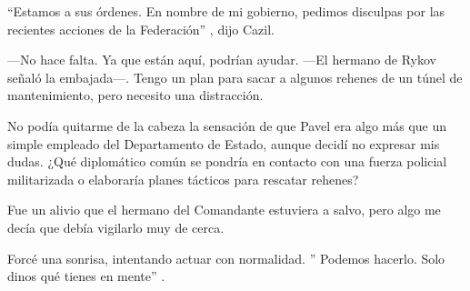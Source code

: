 ``Estamos a sus órdenes. En nombre de mi gobierno, pedimos disculpas por las recientes acciones de la Federación''
, dijo Cazil.

—No hace falta. Ya que están aquí, podrían ayudar. —El hermano de Rykov señaló la embajada—. Tengo un plan para sacar a algunos rehenes de un túnel de mantenimiento, pero necesito una distracción.

No podía quitarme de la cabeza la sensación de que Pavel era algo más que un simple empleado del Departamento de Estado, aunque decidí no expresar mis dudas. ¿Qué diplomático común se pondría en contacto con una fuerza policial militarizada o elaboraría planes tácticos para rescatar rehenes?

Fue un alivio que el hermano del Comandante estuviera a salvo, pero algo me decía que debía vigilarlo muy de cerca.

Forcé una sonrisa, intentando actuar con normalidad. ''
Podemos hacerlo. Solo dinos qué tienes en mente''
.


